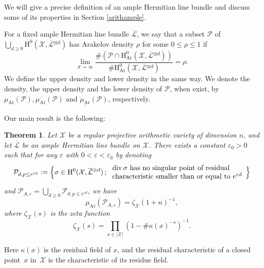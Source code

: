 \documentclass[11pt]{article}
\numberwithin{equation}{section}
\let\epsilon\varepsilon
\newcommand{\sep}{\,;\,}
\theoremstyle{plain}
\newtheorem{thm}{Theorem}[section]
\theoremstyle{definition}
\newcommand{\ho}{\mathrm{H}}
\newcommand{\X}{\mathcal{X}}
\newcommand{\Li}{\overline{\mathcal{L}}{}}
\begin{document}
We will give a precise definition of an ample Hermitian line bundle and discuss some of its properties in Section \ref{arithample}.

For a fixed ample Hermitian line bundle $\Li$, we say that a subset $\mathcal{P}$ of $\bigcup_{d\geq 0}\ho^0(\X, \Li^{\otimes d})$ has Arakelov density $\rho$ for some $0\leq \rho\leq 1$ if
\[
\lim_{d\to \infty} \frac{ \#\left(\mathcal{P}\cap \ho_{\mathrm{Ar}}^0(\X, \Li^{\otimes d})\right) }{\#\ho_{\mathrm{Ar}}^0(\X, \Li^{\otimes d})}=\rho.
\]
We define the upper density and lower density in the same way. We denote the density, the upper density and the lower density of $\mathcal{P}$, when exist, by $\mu_{\mathrm{Ar}}(\mathcal{P}),\overline{\mu_{\mathrm{Ar}}}(\mathcal{P})$ and $\underline{\mu_{\mathrm{Ar}}}(\mathcal{P})$, respectively.

Our main result is the following:

\begin{thm}\label{mainvar}
Let $\X$ be a regular projective arithmetic variety of dimension $n$, and let $\Li$ be an ample Hermitian line bundle on $\X$.
There exists a constant $\epsilon_0>0$ such that for any $\varepsilon$ with $0<\varepsilon<\epsilon_0$ by denoting
\[
\mathcal{P}_{d,p\leq e^{\varepsilon d}}:=\Bigl\{ \sigma\in \ho^0(\X,\Li^{\otimes d})\sep \begin{array}{ll}
\div \sigma \text{ has no singular point of residual} \\
\text{characteristic smaller than or equal to } e^{\varepsilon d}
\end{array}\Bigr\}
\]
and $\mathcal{P}_{A,\varepsilon}=\bigcup_{d\geq 0} \mathcal{P}_{d,p\leq e^{\varepsilon d}}$, we have
\[
\mu_{\mathrm{Ar}}(\mathcal{P}_{A,\varepsilon})=\zeta_{\X}(1+n)^{-1},
\]
where $\zeta_{\X}(s)$ is the zeta function
\[
\zeta_{\X}(s)= \prod_{x\in |\X|}(1-\#\kappa(x)^{-s})^{-1}.
\]
\end{thm}
Here $\kappa(x)$ is the residual field of $x$, and the residual characteristic of a closed point~$x$ in~$\X$ is the characteristic of its residue field.
\end{document}
